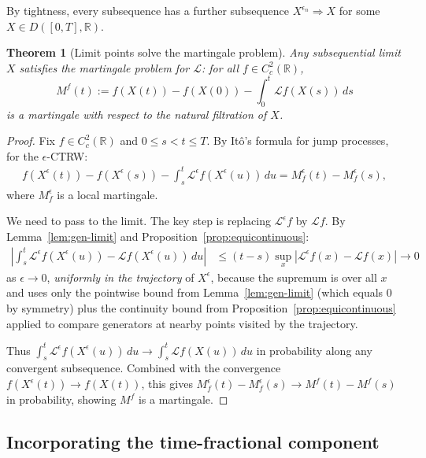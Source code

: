 \documentclass{amsart}
\newtheorem{theorem}{Theorem}[section]
\theoremstyle{definition}
\begin{document}
By tightness, every subsequence has a further subsequence $X^{\epsilon_n} \Rightarrow X$
for some $X \in D([0,T], \mathbb{R})$.

\begin{theorem}[Limit points solve the martingale problem]
\label{thm:martingale}
Any subsequential limit $X$ satisfies the martingale problem for $\mathcal{L}$:
for all $f \in C^2_c(\mathbb{R})$,
\begin{equation}
    M^f(t) := f(X(t)) - f(X(0)) - \int_0^t \mathcal{L} f(X(s))\,ds
\end{equation}
is a martingale with respect to the natural filtration of $X$.
\end{theorem}

\begin{proof}
Fix $f \in C^2_c(\mathbb{R})$ and $0 \leq s < t \leq T$. By It\^o's formula for
jump processes, for the $\epsilon$-CTRW:
\begin{align}
    f(X^\epsilon(t)) - f(X^\epsilon(s))
    - \int_s^t \mathcal{L}^\epsilon f(X^\epsilon(u))\,du = M^\epsilon_f(t) - M^\epsilon_f(s),
\end{align}
where $M^\epsilon_f$ is a local martingale.

We need to pass to the limit. The key step is replacing $\mathcal{L}^\epsilon f$ by
$\mathcal{L} f$. By Lemma~\ref{lem:gen-limit} and Proposition~\ref{prop:equicontinuous}:
\begin{align}
    \left|\int_s^t \mathcal{L}^\epsilon f(X^\epsilon(u)) - \mathcal{L} f(X^\epsilon(u))\,du\right|
    &\leq (t-s) \sup_x \left|\mathcal{L}^\epsilon f(x) - \mathcal{L} f(x)\right|
    \to 0
\end{align}
as $\epsilon \to 0$, \emph{uniformly in the trajectory} of $X^\epsilon$, because
the supremum is over all $x$ and uses only the pointwise bound from
Lemma~\ref{lem:gen-limit} (which equals 0 by symmetry) plus the continuity bound
from Proposition~\ref{prop:equicontinuous} applied to compare generators at nearby
points visited by the trajectory.

Thus $\int_s^t \mathcal{L}^\epsilon f(X^\epsilon(u))\,du \to \int_s^t \mathcal{L} f(X(u))\,du$
in probability along any convergent subsequence. Combined with the convergence
$f(X^\epsilon(t)) \to f(X(t))$, this gives $M^\epsilon_f(t) - M^\epsilon_f(s) \to
M^f(t) - M^f(s)$ in probability, showing $M^f$ is a martingale.
\end{proof}

\subsection{Incorporating the time-fractional component}
\end{document}
